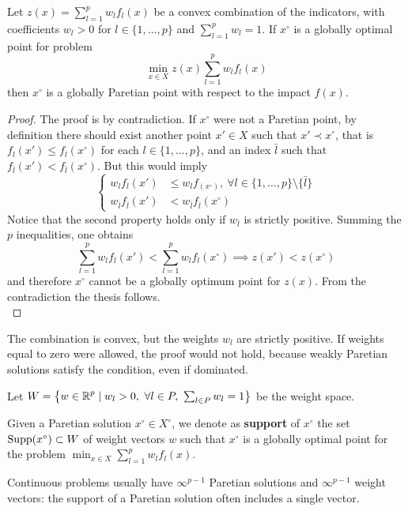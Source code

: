 \begin{theo}
	Let $z(x) = \sum_{l = 1}^p w_l f_l (x)$ be a convex combination of the indicators, with coefficients $w_l > 0$ for $l \in \{1, \dots, p\}$ and $\sum_{l = 1}^p w_l = 1$. If $x^\circ$ is a globally optimal point for problem 
	$$ \min_{x \in X} z(x) \sum_{l = 1}^p w_l f_l (x) $$
	then $x^\circ$ is a globally Paretian point with respect to the impact $f(x)$.
\end{theo}
\begin{proof}
	The proof is by contradiction. If $x^\circ$ were not a Paretian point, by definition there should exist another point $x' \in X$ such that $x' \prec x^\circ$, that is $f_l (x') \leq f_l(x^\circ)$ for each $l \in \{1, \dots, p\}$, and an index $\bar l$ such that $f_{\bar l} (x') < f_{\bar l} (x^\circ)$. But this would imply
	$$ 
	\begin{cases}
		w_l f_l (x') & \leq w_l f_ (x^\circ), \ \forall l \in \{1, \dots, p\} \setminus \{\bar l\} \\
		w_{\bar l} f_{\bar l} (x') & < w_{\bar l} f_{\bar l} (x^\circ)
	\end{cases}
	$$
	Notice that the second property holds only if $w_{\bar l}$ is strictly positive. Summing the $p$ inequalities, one obtains
	$$ \sum_{l = 1}^p w_l f_l (x') < \sum_{l = 1}^p w_l f_l (x^\circ) \implies z(x') < z(x^\circ) $$
	and therefore $x^\circ$ cannot be a globally optimum point for $z(x)$. From the contradiction the thesis follows.\\
\end{proof}

The combination is convex, but the weights $w_l$ are strictly positive. If weights equal to zero were allowed, the proof would not hold, because weakly Paretian solutions satisfy the condition, even if dominated.

Let $W = \left\{w \in \operatorname{\mathbb{R}}^p \mid w_l > 0, \ \forall l \in P, \ \sum_{l \in P} w_l = 1 \right\}$ be the weight space. \\

\begin{definition}
	Given a Paretian solution $x^\circ \in X^\circ$, we denote as \textbf{support} of $x^\circ$ the set $\operatorname{Supp}(x^\circ) \subset W$ of weight vectors $w$ such that $x^\circ$ is a globally optimal point for the problem $\min_{x \in X} \sum_{l = 1}^p w_l f_l (x)$.
\end{definition}

Continuous problems usually have $\infty^{p-1}$ Paretian solutions and $\infty^{p-1}$ weight vectors: the support of a Paretian solution often includes a single vector. 

